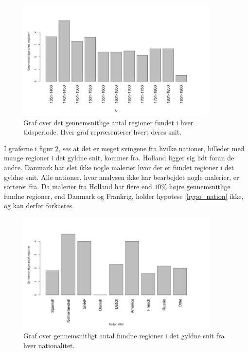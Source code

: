 {\begin{figure}[!h]
	\begin{center}
		\includegraphics[angle=0,width=0.90\textwidth]{afsnit/resultater/billeder/yearcutU.png}
	\end{center}
    \caption{Graf over det gennemsnitlige antal regioner fundet i hver
    tidsperiode. Hver graf repræsenterer hvert deres snit.}
	\label{udvidet_year}
\end{figure}

I graferne i figur \ref{udvidet_nation}, ses at det er meget svingene
fra hvilke nationer, billeder med mange regioner i det gyldne snit,
kommer fra. Holland ligger sig lidt foran de andre. Danmark har slet
ikke nogle malerier hvor der er fundet regioner i det gyldne snit. Alle
nationer, hvor analysen ikke har bearbejdet nogle malerier, er sorteret
fra. Da malerier fra Holland har flere end $10\%$ højre gennemsnitlige
fundne regioner, end Danmark og Frankrig, holder hypotese
\ref{hypo_nation} ikke, og kan derfor forkastes.

\begin{figure}[!h]
	\begin{center}
		\includegraphics[angle=0,width=0.90\textwidth]{afsnit/resultater/billeder/nationcutU.png}
	\end{center}
    \caption{Graf over gennemsnitligt antal fundne regioner i det gyldne
    snit fra hver nationalitet.}
	\label{udvidet_nation}
\end{figure}

}

